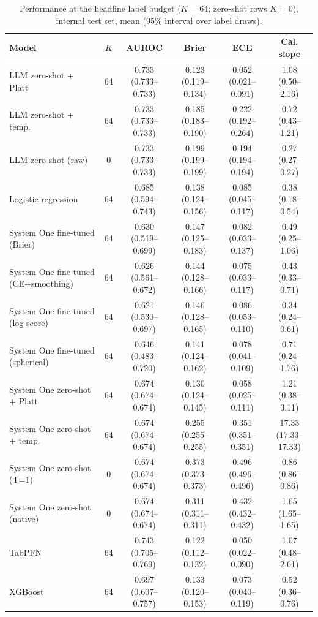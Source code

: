 \begin{table}[!t]
\caption{Performance at the headline label budget ($K{=}64$; zero-shot rows $K{=}0$), internal test set, mean (95\% interval over label draws).}
\label{tab:main_int}
\centering
\footnotesize
\begin{tabular}{lccccc}
\hline
Model & $K$ & AUROC & Brier & ECE & Cal. slope \\ \hline
LLM zero-shot + Platt & 64 & 0.733 (0.733--0.733) & 0.123 (0.119--0.134) & 0.052 (0.021--0.091) & 1.08 (0.50--2.16) \\
LLM zero-shot + temp. & 64 & 0.733 (0.733--0.733) & 0.185 (0.183--0.190) & 0.222 (0.192--0.264) & 0.72 (0.43--1.21) \\
LLM zero-shot (raw) & 0 & 0.733 (0.733--0.733) & 0.199 (0.199--0.199) & 0.194 (0.194--0.194) & 0.27 (0.27--0.27) \\
Logistic regression & 64 & 0.685 (0.594--0.743) & 0.138 (0.124--0.156) & 0.085 (0.045--0.117) & 0.38 (0.18--0.54) \\
System One fine-tuned (Brier) & 64 & 0.630 (0.519--0.699) & 0.147 (0.125--0.183) & 0.082 (0.033--0.137) & 0.49 (0.25--1.06) \\
System One fine-tuned (CE+smoothing) & 64 & 0.626 (0.561--0.672) & 0.144 (0.128--0.166) & 0.075 (0.033--0.117) & 0.43 (0.33--0.71) \\
System One fine-tuned (log score) & 64 & 0.621 (0.530--0.697) & 0.146 (0.128--0.165) & 0.086 (0.053--0.110) & 0.34 (0.24--0.61) \\
System One fine-tuned (spherical) & 64 & 0.646 (0.483--0.720) & 0.141 (0.124--0.162) & 0.078 (0.041--0.109) & 0.71 (0.24--1.76) \\
System One zero-shot + Platt & 64 & 0.674 (0.674--0.674) & 0.130 (0.124--0.145) & 0.058 (0.025--0.111) & 1.21 (0.38--3.11) \\
System One zero-shot + temp. & 64 & 0.674 (0.674--0.674) & 0.255 (0.255--0.255) & 0.351 (0.351--0.351) & 17.33 (17.33--17.33) \\
System One zero-shot (T=1) & 0 & 0.674 (0.674--0.674) & 0.373 (0.373--0.373) & 0.496 (0.496--0.496) & 0.86 (0.86--0.86) \\
System One zero-shot (native) & 0 & 0.674 (0.674--0.674) & 0.311 (0.311--0.311) & 0.432 (0.432--0.432) & 1.65 (1.65--1.65) \\
TabPFN & 64 & 0.743 (0.705--0.769) & 0.122 (0.112--0.132) & 0.050 (0.022--0.090) & 1.07 (0.48--2.61) \\
XGBoost & 64 & 0.697 (0.607--0.757) & 0.133 (0.120--0.153) & 0.073 (0.040--0.119) & 0.52 (0.36--0.76) \\
\hline
\end{tabular}
\end{table}